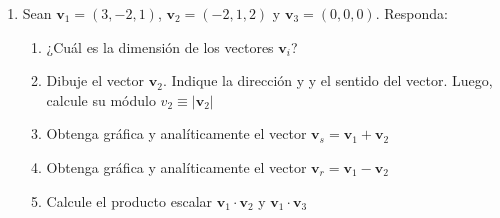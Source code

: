 \documentclass[a4paper,12pt]{article}
\begin{document}
\begin{enumerate}
\item Sean $\mathbf{v}_1=(3,-2,1)$, $\mathbf{v}_2=(-2,1,2)$ y $\mathbf{v}_3=(0,0,0)$. Responda:
    \begin{enumerate}
      \item ¿Cuál es la dimensión de los vectores $\mathbf{v}_i$?
      \item Dibuje el vector $\mathbf{v}_2$. Indique la dirección y y el sentido del vector. Luego, calcule su módulo $v_2 \equiv |\mathbf{v}_2|$ 
      \item Obtenga gráfica y analíticamente el vector $\mathbf{v}_s=\mathbf{v}_1 + \mathbf{v}_2$
      \item Obtenga gráfica y analíticamente el vector $\mathbf{v}_r=\mathbf{v}_1 - \mathbf{v}_2$
      \item Calcule el producto escalar $\mathbf{v}_1 \cdot \mathbf{v}_2$ y $\mathbf{v}_1 \cdot \mathbf{v}_3$
    \end{enumerate}
\end{enumerate}
\end{document}
